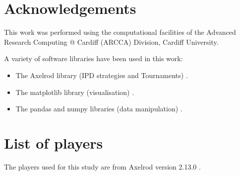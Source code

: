 \documentclass{article}
\begin{document}

\section*{Acknowledgements}

This work was performed using the computational facilities of the Advanced
Research Computing @ Cardiff (ARCCA) Division, Cardiff University.

A variety of software libraries have been used in this work:

\begin{itemize}
    \item The Axelrod library (IPD strategies and Tournaments)
        \cite{axelrodproject}.
    \item The matplotlib library (visualisation) \cite{hunter2007matplotlib}.
    \item The pandas and numpy libraries (data manipulation)
        \cite{mckinney2010data, walt2011numpy}.
\end{itemize}

\printbibliography

\appendix

\section{List of players}\label{app:list_of_players}

The players used for this study are from Axelrod version 2.13.0
\cite{axelrodproject}.

\begin{multicols}{2}
	\begin{enumerate}
		
	\end{enumerate}
\end{multicols}
\end{document}
